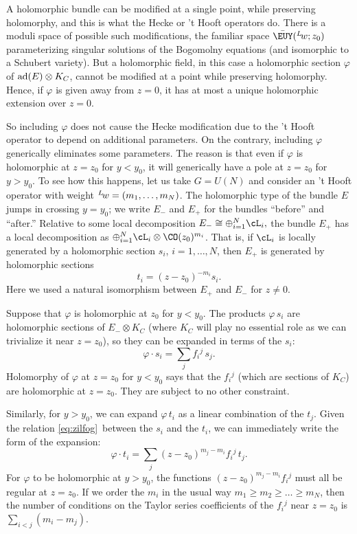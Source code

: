 A holomorphic bundle can be modified at a single point, while
preserving holomorphy, and this is what the Hecke or 't Hooft
operators do.  There is a moduli space of possible such
modifications, the familiar space $\bar {\EUY}({}^L\negthinspace
w;z_0)$ parameterizing singular solutions of the Bogomolny
equations (and isomorphic to a Schubert variety). But a
holomorphic field, in this case a holomorphic section $\varphi$ of
${\rm ad}(E)\otimes K_C$, cannot be modified at a point while
preserving holomorphy. Hence, if $\varphi$ is given away from
$z=0$, it has at most a unique holomorphic extension over $z=0$.

So including $\varphi$ does not cause the Hecke modification due
to the 't Hooft operator to depend on additional parameters.  On
the contrary, including $\varphi$ generically eliminates some
parameters.  The reason is that even if $\varphi$ is holomorphic
at $z=z_0$ for $y<y_0$, it will generically have a pole at $z=z_0$
for $y>y_0$.  To see how this happens, let us take $G=U(N)$ and
consider an 't Hooft operator with weight $^L\negthinspace
w=(m_1,\ldots,m_N)$. The holomorphic type of the bundle $E$ jumps
in crossing $y=y_0$; we write $E_-$ and $E_+$ for the bundles
``before'' and ``after.'' Relative to some local decomposition
$E_-\cong \oplus_{i=1}^N \cL_i,$ the bundle $E_+$ has a local
decomposition as $\oplus_{i=1}^N\cL_i\otimes \CO(z_0)^{m_i}$. That
is, if $\cL_i$ is locally generated by a holomorphic section
$s_i$, $i=1,\ldots,N$, then $E_+$ is generated by holomorphic
sections %
\setcounter{equation}{36}
\begin{equation}\label{eq:zilfog}
t_i=(z-z_0)^{-m_i} s_i.
\end{equation}
 Here we used a
natural isomorphism between $E_+$ and $E_-$ for $z\neq 0$.

Suppose that $\varphi$ is holomorphic at $z_0$ for $y<y_0$. The
products $\varphi \,s_i$ are holomorphic sections of $E_- \otimes
K_C$ (where $K_C$ will play no essential role as we can trivialize
it near $z=z_0$), so they can be expanded in terms of the $s_i$:
\setcounter{equation}{37}
\begin{equation}\label{eq:bongo}
\varphi\cdot s_i=\sum_j f_i{}^j\,s_j.
\end{equation}
  Holomorphy of
$\varphi$ at $z=z_0$ for $y<y_0$ says that the $f_i{}^j$ (which
are sections of $K_C$) are holomorphic at $z=z_0$.  They are
subject to no other constraint.

Similarly, for $y>y_0$, we can expand $\varphi\,t_i$ as a linear
combination of the $t_j$.  Given the relation \eqref{eq:zilfog}\ between the
$s_i$ and the $t_i$, we can immediately write the form of the
expansion: %
\setcounter{equation}{38}
\begin{equation}\label{eq:bzongo}
\varphi\cdot t_i=\sum_j
(z-z_0)^{m_j-m_i}f_i{}^j\,t_j.
\end{equation}
 For $\varphi$ to be holomorphic at
$y>y_0$, the functions $(z-z_0)^{m_j-m_i}f_i{}^j$ must all be
regular at $z=z_0$.  If we order the $m_i$ in the usual way
$m_1\geq m_2\geq\dots\geq m_N$, then the number of conditions on
the Taylor series coefficients of the $f_i{}^j$ near $z=z_0$ is
$\sum_{i<j}(m_i-m_j)$.

